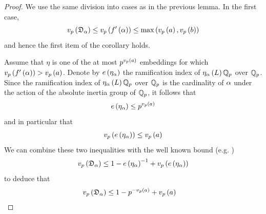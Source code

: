 \documentclass[../main.tex]{subfiles}
\begin{document}
\begin{proof}
  We use the same division into cases as in the previous lemma.
  In the first case, 
  \begin{equation*}
    v_p\left( \mathfrak{D}_\alpha \right) \leq
    v_p\left( f'\left( \alpha \right) \right) \leq 
    \max\left( v_p\left( a \right), v_p\left( b \right) \right)
  \end{equation*}
  and hence the first item of the corollary holds. 


  Assume that $\eta$ is one of the at most $p^{v_p\left( a \right)}$ embeddings for which $v_p\left( f'\left( \alpha \right) \right) > v_p\left( a \right)$.
  Denote by $e\left( \eta_\alpha \right)$ the ramification index of $\eta_\alpha\left( L \right)\mathbb{Q}_p$ over $\mathbb{Q}_p$.
  Since the ramification index of $\eta_\alpha\left( L \right)\mathbb{Q}_p$ over $\mathbb{Q}_p$ is the cardinality of $\alpha$ under the action of the absolute inertia group of $\mathbb{Q}_p$, it follows that $$e\left( \eta_\alpha \right) \leq p^{v_p\left( a \right)}$$ and in particular that 
  \[
    v_p\left( e\left( \eta_\alpha \right) \right) \leq v_p\left( a \right)
  \]
  We can combine these two inequalities with the well known bound (e.g. \cite[p. 58]{SerreLocalFields}) 
  \[
    v_p\left( \mathfrak{D}_\alpha \right) \leq 
    1 - e\left( \eta_\alpha \right)^{-1} + v_p\left( e\left( \eta_\alpha \right) \right)
  \]
  to deduce that
  \begin{align*}
    & v_p\left( \mathfrak{D}_\alpha \right) \leq
     1 - p^{-v_p\left( a \right)} + v_p\left( a \right)
  \end{align*}
\end{proof}
\end{document}
